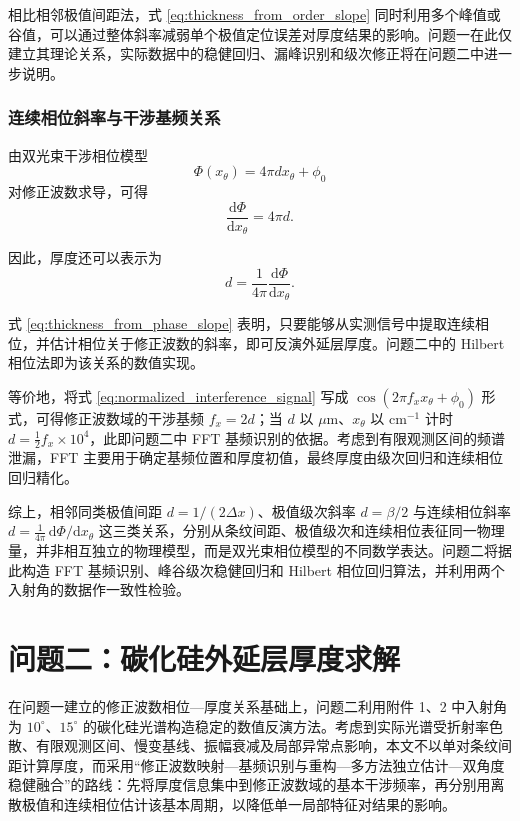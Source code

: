 \documentclass[withoutpreface,bwprint]{cumcmthesis}
\begin{document}
相比相邻极值间距法，式 \eqref{eq:thickness_from_order_slope} 同时利用多个峰值或谷值，可以通过整体斜率减弱单个极值定位误差对厚度结果的影响。问题一在此仅建立其理论关系，实际数据中的稳健回归、漏峰识别和级次修正将在问题二中进一步说明。

\subsubsection{连续相位斜率与干涉基频关系}

由双光束干涉相位模型
\begin{equation}
	\Phi(x_\theta)
	=
	4\pi d x_\theta+\phi_0
	\label{eq:linear_phase_relation}
\end{equation}
对修正波数求导，可得
\begin{equation}
	\frac{\mathrm d\Phi}{\mathrm d x_\theta}
	=
	4\pi d.
	\label{eq:phase_derivative_relation}
\end{equation}

因此，厚度还可以表示为
\begin{equation}
	d
	=
	\frac{1}{4\pi}
	\frac{\mathrm d\Phi}{\mathrm d x_\theta}.
	\label{eq:thickness_from_phase_slope}
\end{equation}

式 \eqref{eq:thickness_from_phase_slope} 表明，只要能够从实测信号中提取连续相位，并估计相位关于修正波数的斜率，即可反演外延层厚度。问题二中的 Hilbert 相位法即为该关系的数值实现。

等价地，将式 \eqref{eq:normalized_interference_signal} 写成 $\cos(2\pi f_x x_\theta+\phi_0)$ 形式，可得修正波数域的干涉基频 $f_x=2d$；当 $d$ 以 $\mu\mathrm{m}$、$x_\theta$ 以 $\mathrm{cm}^{-1}$ 计时 $d=\tfrac{1}{2}f_x\times10^4$，此即问题二中 FFT 基频识别的依据。考虑到有限观测区间的频谱泄漏，FFT 主要用于确定基频位置和厚度初值，最终厚度由级次回归和连续相位回归精化。

综上，相邻同类极值间距 $d=1/(2\Delta x)$、极值级次斜率 $d=\beta/2$ 与连续相位斜率 $d=\tfrac{1}{4\pi}\,\mathrm d\Phi/\mathrm d x_\theta$ 这三类关系，分别从条纹间距、极值级次和连续相位表征同一物理量，并非相互独立的物理模型，而是双光束相位模型的不同数学表达。问题二将据此构造 FFT 基频识别、峰谷级次稳健回归和 Hilbert 相位回归算法，并利用两个入射角的数据作一致性检验。


\section{问题二：碳化硅外延层厚度求解}
在问题一建立的修正波数相位—厚度关系基础上，问题二利用附件 1、2 中入射角为 $10^\circ$、$15^\circ$ 的碳化硅光谱构造稳定的数值反演方法。考虑到实际光谱受折射率色散、有限观测区间、慢变基线、振幅衰减及局部异常点影响，本文不以单对条纹间距计算厚度，而采用“修正波数映射—基频识别与重构—多方法独立估计—双角度稳健融合”的路线：先将厚度信息集中到修正波数域的基本干涉频率，再分别用离散极值和连续相位估计该基本周期，以降低单一局部特征对结果的影响。
\end{document}

